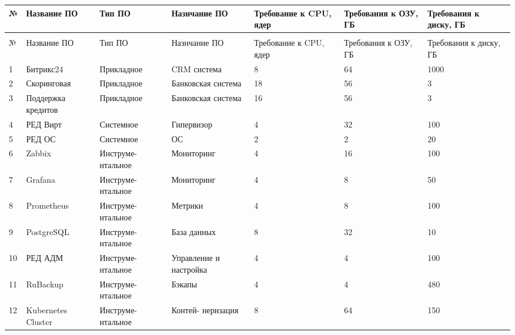 \documentclass[14pt, a4paper]{extarticle}
\begin{document}
\begin{tabularx}{\textwidth}{|l|X|X|X|X|X|X|}
  \caption{Общие системные требования\label{tab:summary-system-requirements}}                                                                    \\
  \hline
  №  & Название ПО        & Тип ПО             & Назнчание ПО           & Требование к CPU, ядер & Требования к ОЗУ, ГБ & Требования к диску, ГБ \\ \hline
  \endfirsthead
  \caption*{Продолжение таблицы~\ref{tab:summary-system-requirements}}                                                                           \\
  \hline
  №  & Название ПО        & Тип ПО             & Назнчание ПО           & Требование к CPU, ядер & Требования к ОЗУ, ГБ & Требования к диску, ГБ \\ \hline
  \endhead
  \endfoot
  \endlastfoot

  1  & Битрикс24          & Прикладное         & CRM система            & 8                      & 64                   & 1000                   \\ \hline
  2  & Скоринговая        & Прикладное         & Банковская система     & 18                     & 56                   & 3                      \\ \hline
  3  & Поддержка кредитов & Прикладное         & Банковская система     & 16                     & 56                   & 3                      \\ \hline
  4  & РЕД Вирт           & Системное          & Гипервизор             & 4                      & 32                   & 100                    \\ \hline
  5  & РЕД ОС             & Системное          & ОС                     & 2                      & 2                    & 20                     \\ \hline
  6  & Zabbix             & Инструме- нтальное & Мониторинг             & 4                      & 16                   & 100                    \\ \hline
  7  & Grafana            & Инструме- нтальное & Мониторинг             & 4                      & 8                    & 50                     \\ \hline
  8  & Prometheus         & Инструме- нтальное & Метрики                & 4                      & 8                    & 100                    \\ \hline
  9  & PostgreSQL         & Инструме- нтальное & База данных            & 8                      & 32                   & 10                     \\ \hline
  10 & РЕД АДМ            & Инструме- нтальное & Управление и настройка & 4                      & 4                    & 100                    \\ \hline
  11 & RuBackup           & Инструме- нтальное & Бэкапы                 & 4                      & 4                    & 480                    \\ \hline
  12 & Kubernetes Cluster & Инструме- нтальное & Контей- неризация      & 8                      & 64                   & 150                    \\ \hline
\end{tabularx}
\end{document}
